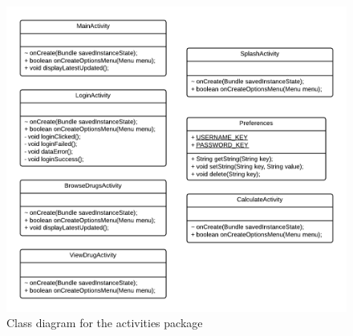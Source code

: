 \documentclass[11pt,fleqn,twoside]{article}
\begin{document}
\begin{figure}[H]
\centering
\includegraphics[width=6.5in]{activities}
\caption{Class diagram for the activities package}
\end{figure}

\end{document}
